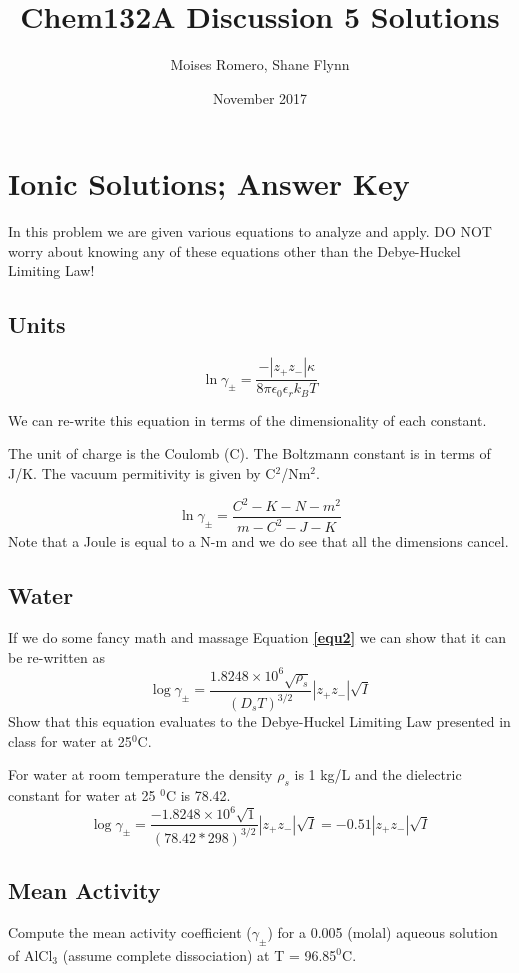 \documentclass{article}
\title{Chem132A Discussion 5 Solutions}
\author{Moises Romero, Shane Flynn}
\date{November 2017}
\newcommand{\be}{\begin{equation}}
\newcommand{\ee}{\end{equation}}
\begin{document}
\maketitle

\section{Ionic Solutions; Answer Key}
In this problem we are given various equations to analyze and apply. 
DO NOT worry about knowing any of these equations other than the Debye-Huckel Limiting Law!

\subsection{Units}
\be \label{equ2}
\ln \gamma_\pm = \frac{-|z_+z_-|\kappa}{8\pi \epsilon_0 \epsilon_r k_BT}
\ee

We can re-write this equation in terms of the dimensionality of each constant. 

The unit of charge is the Coulomb (C).
The Boltzmann constant is in terms of J/K.
The vacuum permitivity is given by C$^2$/Nm$^2$. 

\be 
\ln \gamma_\pm = \frac{C^2-K-N-m^2}{m-C^2-J-K}
\ee
Note that a Joule is equal to a N-m and we do see that all the dimensions cancel. 

\subsection{Water}
If we do some fancy math and massage Equation \textbf{\ref{equ2}} we can show that it can be re-written as
\be \label{equ4}
\log \gamma_\pm = \frac{1.8248\times 10^6 \sqrt{\rho_s}}{(D_sT)^{3/2}} |z_+z_-|\sqrt{I}
\ee
Show that this equation evaluates to the Debye-Huckel Limiting Law presented in class for water at 25$^0$C. 

For water at room temperature the density $\rho_s$ is 1 kg/L and the dielectric constant for water at 25 $^0$C is 78.42.
\be \label{equ4}
\log \gamma_\pm = \frac{-1.8248\times 10^6 \sqrt{1}}{(78.42*298)^{3/2}} |z_+z_-|\sqrt{I} = -0.51 |z_+z_-|\sqrt{I}
\ee

\subsection{Mean Activity}
Compute the mean activity coefficient ($\gamma_\pm$) for a 0.005 (molal) aqueous solution of AlCl$_3$ (assume complete dissociation) at T = 96.85$^0$C. 
\end{document}
